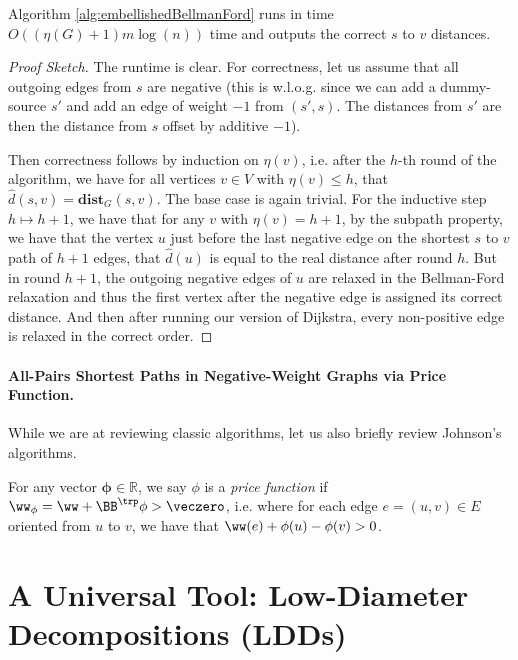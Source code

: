 \begin{theorem}
Algorithm \ref{alg:embellishedBellmanFord} runs in time $O((\eta(G) + 1) m \log(n))$ time and outputs the correct $s$ to $v$ distances.
\end{theorem}
\begin{proof}[Proof Sketch]
The runtime is clear.  For correctness, let us assume that all outgoing edges from $s$ are negative (this is w.l.o.g. since we can add a dummy-source $s'$ and add an edge of weight $-1$ from $(s', s)$. The distances from $s'$ are then the distance from $s$ offset by additive $-1$).  

Then correctness follows by induction on $\eta(v)$, i.e. after the $h$-th round of the algorithm, we have for all vertices $v \in V$ with $\eta(v) \leq h$, that $\hat{d}(s,v) = \mathbf{dist}_G(s,v)$. The base case is again trivial. For the inductive step $h \mapsto h+1$, we have that for any $v$ with $\eta(v) = h+1$, by the subpath property, we have that the vertex $u$ just before the last negative edge on the shortest $s$ to $v$ path of $h+1$ edges, that $\hat{d}(u)$ is equal to the real distance after round $h$. But in round $h+1$, the outgoing negative edges of $u$ are relaxed in the Bellman-Ford relaxation and thus the first vertex after the negative edge is assigned its correct distance. And then after running our version of Dijkstra, every non-positive edge is relaxed in the correct order.
\end{proof}

\paragraph{All-Pairs Shortest Paths in Negative-Weight Graphs via Price Function.} While we are at reviewing classic algorithms, let us also briefly review Johnson's algorithms.

\begin{definition}
For any vector $\mathbf{\phi} \in \mathbb{R}$, we say $\phi$ is a \emph{price function} if $\ww_{\mathbf{\phi}} = \ww + \BB^{\trp} \mathbf{\phi} > \veczero$, i.e. where for each edge $e = (u,v) \in E$ oriented from $u$ to $v$, we have that $\ww(e) + \phi(u) - \phi(v) > 0$.
\end{definition}



\section{A Universal Tool: Low-Diameter Decompositions (LDDs)}

